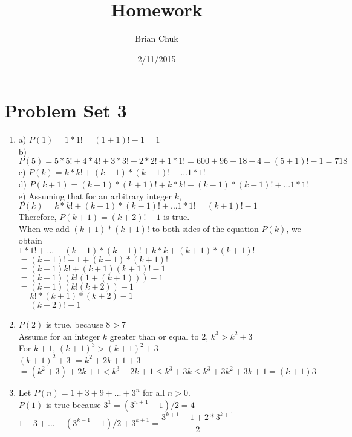 \documentclass[11pt]{article}
\title{\textbf{Homework}}
\author{Brian Chuk}
\date{2/11/2015}
\begin{document}
\maketitle

\section{Problem Set 3}
\begin{enumerate}

\item
	a)	$P(1) = 1 * 1! = (1+1)! - 1 = 1$\\
	b)	$P(5) = 5 * 5! + 4 * 4! + 3 * 3! + 2 * 2! + 1 * 1! = 600 + 96 + 18 + 4 = (5+1)! - 1 = 718$\\
	c)	$P(k) = k * k! + (k-1)*(k-1)!+...1*1!$\\
	d)	$P(k+1) = (k+1) * (k+1)! + k * k! + (k-1)*(k-1)!+...1*1!$\\
	e)	Assuming that for an arbitrary integer $k$, \\$P(k) = k * k! + (k-1)*(k-1)!+...1*1! = (k+1)!-1$ \\
	Therefore, $P(k+1) = (k+2)!-1$ is true.\\
	When we add $(k+1) * (k+1)!$ to both sides of the equation $P(k)$, we obtain\\
	$1 * 1! + ... + (k-1)*(k-1)! + k * k + (k + 1) * (k+1)!$\\
	$ = (k+1)!-1 + (k + 1) * (k + 1 )! $ \\
	$ = (k+1)k! + (k + 1)(k + 1)! - 1$ \\
	$ = (k+1)(k!(1 + (k + 1))) - 1$ \\
	$ = (k+1)(k!(k + 2)) - 1$ \\
	$ = k! * (k+1) * (k+2) - 1$ \\
	$= (k + 2)! - 1$
\item
	$P(2)$ is true, because $8 > 7$\\
	Assume for an integer $k$ greater than or equal to 2, $k^3 > k^2 + 3$\\
	For $k+1$, $(k+1)^3 > (k+1)^2 + 3$\\
	$(k + 1)^2 + 3$
	$= k^2 + 2k + 1 + 3$\\
	$= (k^2 + 3) + 2k + 1 < k^3 + 2k + 1 \leq k^3 + 3k \leq k^3 + 3k^2 + 3k + 1 = (k + 1)3$
\item
	Let $P(n) = 1 + 3 + 9 + ... + 3^n$ for all $n > 0$.\\
	$P(1)$ is true because $3^1 = (3^{n+1} - 1)/2= 4$\\
	$1 + 3 + ... + (3^{k-1} - 1)/2 + 3^{k+1} = \dfrac{3^{k+1} - 1 + 2 * 3^{k+1}}{2}$\\

\end{enumerate}
\end{document}
